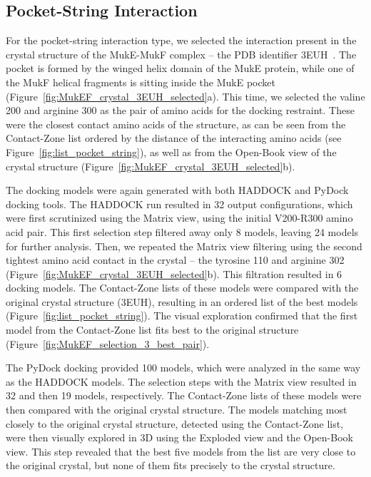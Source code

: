 \documentclass{bmcart}
\def\OpBook {Open-Book view\xspace}
\def\ExpView {Exploded view\xspace}
\def\MatView {Matrix view\xspace}
\def\CoZoList{Contact-Zone list\xspace}
\def\CoZoLists{Contact-Zone lists\xspace}
\begin{document}
\subsection*{Pocket-String Interaction}
For the pocket-string interaction type, we selected the interaction present in the crystal structure of the MukE-MukF complex --  the PDB identifier 3EUH~\cite{Woo}. 
The pocket is formed by the winged helix domain of the MukE protein, while one of the MukF helical fragments is sitting inside the MukE pocket (Figure~\ref{fig:MukEF_crystal_3EUH_selected}a). 
This time, we selected the valine 200 and arginine 300 as the pair of amino acids for the docking restraint. 
These were the closest contact amino acids of the structure, as can be seen from the \CoZoList ordered by the distance of the interacting amino acids (see Figure~\ref{fig:list_pocket_string}), as well as from the \OpBook of the crystal structure (Figure~\ref{fig:MukEF_crystal_3EUH_selected}b). 

The docking models were again generated with both HADDOCK and PyDock docking tools.
The HADDOCK run resulted in 32 output configurations, which were first scrutinized using the \MatView, using the initial V200-R300 amino acid pair. 
This first selection step filtered away only 8 models, leaving 24 models for further analysis. 
Then, we repeated the \MatView filtering using the second tightest amino acid contact in the crystal -- the tyrosine 110 and arginine 302 (Figure~\ref{fig:MukEF_crystal_3EUH_selected}b). 
This filtration resulted in 6 docking models. 
The \CoZoLists of these models were compared with the original crystal structure (3EUH), resulting in an ordered list of the best models (Figure~\ref{fig:list_pocket_string}).
The visual exploration confirmed that the first model from the \CoZoList fits best to the original structure (Figure~\ref{fig:MukEF_selection_3_best_pair}). 

The PyDock docking provided 100 models, which were analyzed in the same way as the HADDOCK models. 
The selection steps with the \MatView resulted in 32 and then 19 models, respectively. 
The \CoZoLists of these models were then compared with the original crystal structure.
The models matching most closely to the original crystal structure, detected using the \CoZoList, were then visually explored in 3D using the \ExpView and the \OpBook.
This step revealed that the best five models from the list are very close to the original crystal, but none of them fits precisely to the crystal structure.
\end{document}
